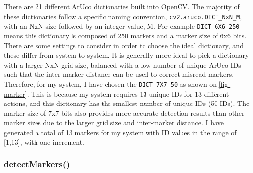 \documentclass[oneside,%
                    author={Malak Hajji},
                    degree={BSc},
                    title={Designing An Accessible Ozobot Programming Platform for Students},
                  subtitle={With Mixed Visual Abilities}]{dissertation}
\begin{document}
There are 21 different ArUco dictionaries built into OpenCV. The majority of these dictionaries follow a specific naming convention, \texttt{cv2.aruco.DICT\_NxN\_M}, with an NxN size followed by an integer value, M. For example \texttt{DICT\_6X6\_250} means this dictionary is composed of 250 markers and a marker size of 6x6 bits. There are some settings to consider in order to choose the ideal dictionary, and these differ from system to system. It is generally more ideal to pick a dictionary with a larger NxN grid size, balanced with a low number of unique ArUco IDs such that the inter-marker distance can be used to correct misread markers\cite{opencv-aruco}.
Therefore, for my system, I have chosen the \texttt{DICT\_7X7\_50} as shown on \ref{fig-marker}. This is because my system requires 13 unique IDs for 13 different actions, and this dictionary has the smallest number of unique IDs (50 IDs). The marker size of 7x7 bits also provides more accurate detection results than other marker sizes due to the larger grid size and inter-marker distance. 
I have generated a total of 13 markers for my system with ID values in the range of [1,13], with one increment. 

\subsubsection{detectMarkers()}
\end{document}
